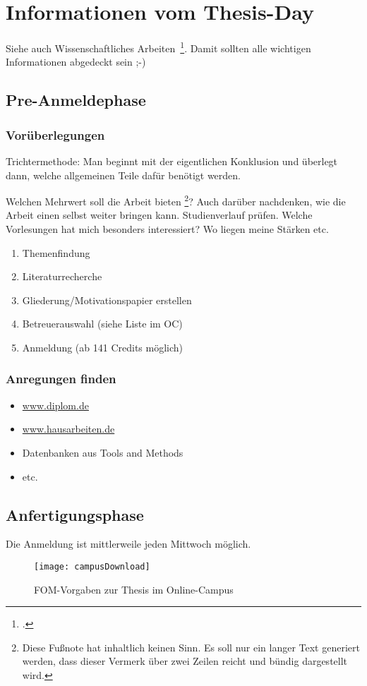 \newpage
\section{Informationen vom Thesis-Day} \label{infos}
Siehe auch Wissenschaftliches Arbeiten~\footcite[\vglf][S. 1]{Balzert.2008}. Damit sollten alle wichtigen Informationen abgedeckt sein ;-)

\subsection{Pre-Anmeldephase}
\subsubsection{Vorüberlegungen}
Trichtermethode: Man beginnt mit der eigentlichen  Konklusion und überlegt dann, welche allgemeinen Teile dafür benötigt werden.

Welchen Mehrwert soll die Arbeit bieten \footnote{Diese Fu\ss note hat inhaltlich keinen Sinn. Es soll nur ein langer Text generiert werden, dass dieser Vermerk über zwei Zeilen reicht und bündig dargestellt wird.}? Auch darüber nachdenken, wie die Arbeit einen selbst weiter bringen kann. Studienverlauf prüfen. Welche Vorlesungen hat mich besonders interessiert? Wo liegen meine Stärken etc.

\begin{enumerate}
\item Themenfindung
\item Literaturrecherche
\item Gliederung/Motivationspapier erstellen
\item Betreuerauswahl (siehe Liste im \ac{OC})
\item Anmeldung (ab 141 Credits möglich)
\end{enumerate}

\subsubsection{Anregungen finden}
\begin{itemize}
\item \href{http://www.diplom.de}{www.diplom.de}
\item \href{http://www.hausarbeiten.de}{www.hausarbeiten.de}
\item Datenbanken aus Tools and Methods
\item etc.
\end{itemize}

\newpage
\subsection{Anfertigungsphase}
Die Anmeldung ist mittlerweile jeden Mittwoch möglich.
\begin{figure}[H]
\caption{FOM-Vorgaben zur Thesis im Online-Campus}
\texttt{[image: campusDownload]}
\\
\cite[Quelle: Vgl.][]{FOM}
\end{figure}

